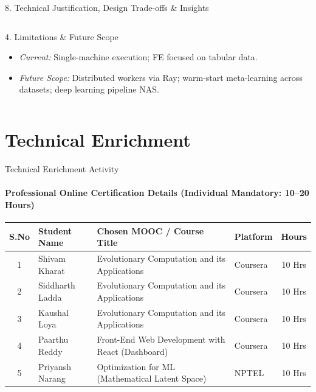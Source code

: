 \documentclass[aspectratio=169, 11pt]{beamer}
\begin{document}
\begin{frame}{8. Technical Justification, Design Trade-offs \& Insights}
\begin{columns}[T]
        \begin{block}{4. Limitations \& Future Scope}
            \scriptsize
            \begin{itemize}
                \setlength{\itemsep}{1pt}
                \item \textit{Current:} Single-machine execution; FE focused on tabular data.
                \item \textit{Future Scope:} Distributed workers via Ray; warm-start meta-learning across datasets; deep learning pipeline NAS.
            \end{itemize}
        \end{block}
    \end{columns}
\end{frame}

\section{Technical Enrichment}
\begin{frame}{Technical Enrichment Activity}
    \framesubtitle{Professional Online Certification Details (Individual Mandatory: 10--20 Hours)}
    \vspace{-0.1cm}
    \begin{table}
        \centering
        \footnotesize
        \renewcommand{\arraystretch}{1.15}
        \begin{tabular}{|c|p{2.8cm}|p{5.0cm}|p{2.0cm}|c|}
            \hline
            \textbf{S.No} & \textbf{Student Name} & \textbf{Chosen MOOC / Course Title} & \textbf{Platform} & \textbf{Hours} \\
            \hline
            1 & Shivam Kharat & Evolutionary Computation and its Applications & Coursera & 10 Hrs \\
            \hline
            2 & Siddharth Ladda & Evolutionary Computation and its Applications & Coursera & 10 Hrs \\
            \hline
            3 & Kaushal Loya & Evolutionary Computation and its Applications & Coursera & 10 Hrs \\
            \hline
            4 & Paarthu Reddy & Front-End Web Development with React (Dashboard) & Coursera & 10 Hrs \\
            \hline
            5 & Priyansh Narang & Optimization for ML (Mathematical Latent Space) & NPTEL & 10 Hrs \\
            \hline
        \end{tabular}
    \end{table}
\end{frame}
\end{document}
